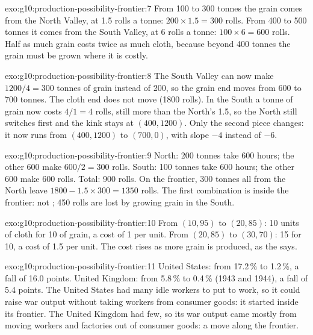 \begin{solution}{exo:g10:production-possibility-frontier:7}
From 100 to 300 tonnes the grain comes from the North Valley, at 1.5 rolls a tonne: $200 \times 1.5 =
300$ rolls. From 400 to 500 tonnes it comes from the South Valley, at 6 rolls a tonne: $100 \times 6 =
600$ rolls. Half as much grain costs twice as much cloth, because beyond 400 tonnes the grain must be
grown where it is costly.
\end{solution}

\begin{solution}{exo:g10:production-possibility-frontier:8}
The South Valley can now make $1200/4 = 300$ tonnes of grain instead of 200, so the grain end moves from
600 to 700 tonnes. The cloth end does not move (1800 rolls). In the South a tonne of grain now costs
$4/1 = 4$ rolls, still more than the North's 1.5, so the North still switches first and the kink stays at
$(400, 1200)$. Only the second piece changes: it now runs from $(400, 1200)$ to $(700, 0)$, with slope
$-4$ instead of $-6$.
\end{solution}

\begin{solution}{exo:g10:production-possibility-frontier:9}
North: 200 tonnes take 600 hours; the other 600 make $600/2 = 300$ rolls. South: 100 tonnes take 600
hours; the other 600 make 600 rolls. Total: 900 rolls. On the frontier, 300 tonnes all from the North
leave $1800 - 1.5 \times 300 = 1350$ rolls. The first combination is inside the frontier: not ; 450 rolls are lost by growing grain in the South.
\end{solution}

\begin{solution}{exo:g10:production-possibility-frontier:10}
From $(10, 95)$ to $(20, 85)$: 10 units of cloth for 10 of grain, a cost of 1 per unit. From $(20, 85)$
to $(30, 70)$: 15 for 10, a cost of 1.5 per unit. The cost rises as more grain is produced, as the  says.
\end{solution}

\begin{solution}{exo:g10:production-possibility-frontier:11}
United States: from 17.2\,\% to 1.2\,\%, a fall of 16.0 points. United Kingdom: from 5.8\,\% to 0.4\,\%
(1943 and 1944), a fall of 5.4 points. The United States had many idle workers to put to work, so it
could raise war output without taking workers from consumer goods: it started inside its frontier. The
United Kingdom had few, so its war output came mostly from moving workers and factories out of consumer
goods: a move along the frontier.
\end{solution}

